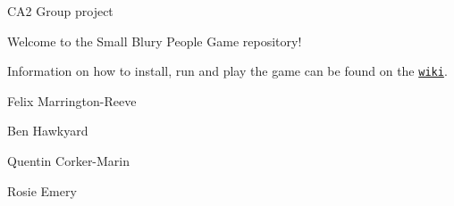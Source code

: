 C\+A2 Group project

Welcome to the Small Blury People Game repository!

Information on how to install, run and play the game can be found on the \href{https://github.com/NCCA/SmallBlurryPeopleCVA3/wiki}{\tt wiki}.

Felix Marrington-\/\+Reeve

Ben Hawkyard

Quentin Corker-\/\+Marin

Rosie Emery 
